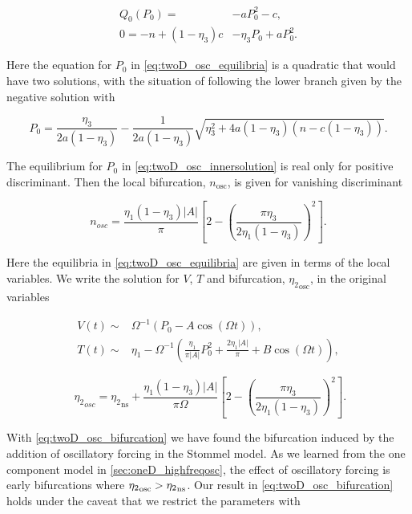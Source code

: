 \begin{equation}\label{eq:twoD_osc_equilibria}
\begin{aligned}
Q_0(P_0)=&-aP_0^2-c,\\
0=-n+(1-\eta_3)c&-\eta_3 P_0+aP_0^2.
\end{aligned}
\end{equation}

Here the equation for $P_0$ in \eqref{eq:twoD_osc_equilibria} is a quadratic that would have two solutions, with the situation of following the lower branch given by the negative solution with

\begin{equation}\label{eq:twoD_osc_innersolution}
P_0=\frac{\eta_3}{2a(1-\eta_3)}- \frac{1}{2a(1-\eta_3)}\sqrt{\eta_3^2+4a(1-\eta_3)(n-c(1-\eta_3))}.
\end{equation}

The equilibrium for $P_0$ in \eqref{eq:twoD_osc_innersolution} is real only for positive discriminant. Then the local bifurcation, $n_{\text{osc}}$, is given for vanishing discriminant 

\begin{equation}\label{eq:twoD_osc_innerbif}
n_{osc} = \frac{\eta_1(1-\eta_3)|A|}{\pi}\left[2-\left(\frac{\pi\eta_3}{2\eta_1(1-\eta_3)}\right)^2\right].
\end{equation}

Here the equilibria in \eqref{eq:twoD_osc_equilibria} are given in terms of the local variables. We write the solution for $V$, $T$ and bifurcation, ${\eta_2}_{\text{osc}}$, in the original variables 

\begin{equation}\label{eq:twoD_osc_innersolnoriginal}
\begin{aligned}
V(t)\sim& \Omega^{-1}\left(P_0-A\cos(\Omega t)\right),\\
T(t)\sim& \eta_1-\Omega^{-1}\left(\frac{\eta_1}{\pi|A|}P_0^2+\frac{2\eta_1|A|}{\pi}+B\cos(\Omega t)\right),
\end{aligned}
\end{equation}

\begin{equation}\label{eq:twoD_osc_bifurcation}
\, \,{\eta_2}_{osc} = {\eta_2}_{\text{ns}}+\frac{\eta_1(1-\eta_3)|A|}{\pi\Omega}\left[2-\left(\frac{\pi\eta_3}{2\eta_1(1-\eta_3)}\right)^2\right].
\end{equation}

\indent With \eqref{eq:twoD_osc_bifurcation} we have found the bifurcation induced by the addition of oscillatory forcing in the Stommel model. As we learned from the one component model in \autoref{sec:oneD_highfreqosc}, the effect of oscillatory forcing is early bifurcations where ${\eta_2}_{\text{osc}}>{\eta_2}_{\text{\text{ns}}}$. Our result in \eqref{eq:twoD_osc_bifurcation} holds under the caveat that we restrict the parameters with 

